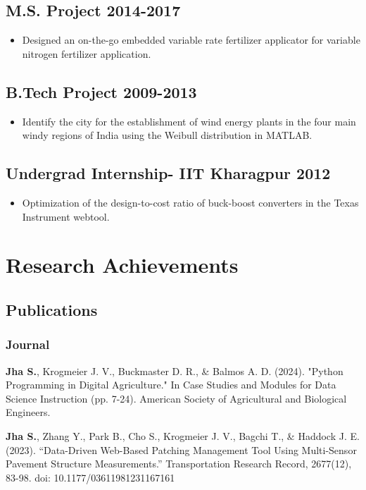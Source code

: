 \documentclass[10pt]{article}
\begin{document}
\subsection{M.S. Project \hfill 2014-2017}
\begin{itemize}
    \item[] Designed an on-the-go embedded variable rate fertilizer applicator for variable nitrogen fertilizer application.
\end{itemize}
\subsection{B.Tech Project \hfill 2009-2013}
\begin{itemize}
    \item[] Identify the city for the establishment of wind energy plants in the four main windy regions of India using the Weibull distribution in MATLAB. 
\end{itemize}
\subsection{ Undergrad Internship- IIT Kharagpur \hfill2012}
\begin{itemize}
    \item[] Optimization of the design-to-cost ratio of buck-boost converters in the Texas Instrument webtool.  
\end{itemize}
\section{Research Achievements}
\subsection{Publications}
\subsubsection{Journal}
\begin{description}
    \item \textbf{Jha S.}, Krogmeier J. V., Buckmaster D. R., \& Balmos A. D. (2024). "Python Programming in Digital Agriculture." In Case Studies and Modules for Data Science Instruction (pp. 7-24). American Society of Agricultural and Biological Engineers.
    \item \textbf{Jha S.}, Zhang Y., Park B., Cho S., Krogmeier J. V., Bagchi T., \& Haddock J. E. (2023). “Data-Driven Web-Based Patching Management Tool Using Multi-Sensor Pavement Structure Measurements.” Transportation Research Record, 2677(12), 83-98. doi: 10.1177/03611981231167161
\end{description}
\end{document}
